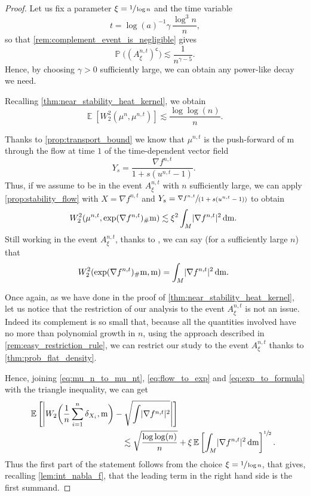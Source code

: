 \documentclass[JEP,XML,SOM,Unicode]{cedram}
\newcommand{\spfrac}[2]{\sfrac{#1}{(#2)}}
\theoremstyle{plain}
\theoremstyle{definition}
\numberwithin{equation}{section}
\renewcommand{\complement}{\ensuremath{\mathsf{c}}}\newcommand{\de}{\ensuremath{\,\mathrm d}}
\newcommand{\E}[1]{\ensuremath{\operatorname{\mathbb{E}}\left[#1\right]}}
\newcommand{\bP}[1]{\ensuremath{\operatorname{\mathbb{P}}\bigl(#1\bigr)}}
\newcommand{\fullstop}{\ensuremath{\text{. }}}
\newcommand{\m}{\ensuremath{\mathrm m}}
\DeclarePairedDelimiter\abs{\lvert}{\rvert}
\begin{document}
\begin{proof}
Let us fix a parameter $\xi=\sfrac1{\log n}$ and the time variable
\[
t=\log(a)^{-1}\gamma\,\frac{\log^3n}{n},
\]
so that \cref{rem:complement_event_is_negligible} gives
$$
\bP{(A^{n,t}_{\xi})^{\complement}} \lesssim \frac{1}{n^{\gamma-5}}\fullstop
$$
Hence, by choosing $\gamma>0$ sufficiently large, we can obtain any power-like decay we need.

Recalling \cref{thm:near_stability_heat_kernel}, we obtain
\begin{equation}\label{eq:mu_n_to_mu_nt}
\E{W^2_2(\mu^n,\mu^{n,t})} \lesssim \frac{\log\log(n)}n \fullstop
\end{equation}

Thanks to \cref{prop:transport_bound} we know that $\mu^{n,t}$ is the push-forward of $\m$ through the
flow at time $1$ of the time-dependent vector field
\begin{equation*}
Y_s = \frac{\nabla f^{n,t}}{1 + s(u^{n,t}-1)} \fullstop
\end{equation*}
Thus, if we assume to be in the event $A^{n,t}_\xi$ with $n$ sufficiently large,
we can apply \cref{prop:stability_flow} with $X=\nabla f^{n,t}$ and
$Y_s=\spfrac{\nabla f^{n,t}}{1 + s(u^{n,t}-1)}$ to obtain
\begin{equation}\label{eq:flow_to_exp}
W^2_2(\mu^{n,t}, \exp(\nabla f^{n,t})_\#\m)
\lesssim
\xi^2\int_M \abs{\nabla f^{n,t}}^2\de\m \fullstop
\end{equation}
Still working in the event $A^{n,t}_\xi$, thanks to \cite[Th.\,1.1]{Glaudo19}, we can say
(for a sufficiently large $n$) that
\begin{equation}\label{eq:exp_to_formula}
W^2_2(\exp(\nabla f^{n,t})_\#\m, \m) = \int_M \abs{\nabla f^{n,t}}^2 \de\m\fullstop
\end{equation}

Once again, as we have done in the proof of \cref{thm:near_stability_heat_kernel},
let us notice that the restriction of our analysis to the event $A^{n,t}_\xi$ is not an issue.
Indeed its complement is so small that,
because all the quantities involved have no more than polynomial growth in $n$, using
the approach described in \cref{rem:easy_restriction_rule}, we can restrict our study to the
event $A^{n,t}_\xi$ thanks to \cref{thm:prob_flat_density}.

Hence, joining \cref{eq:mu_n_to_mu_nt}, \cref{eq:flow_to_exp} and \cref{eq:exp_to_formula}
with the triangle inequality, we can get
\begin{align*}
\E{\abs*{W_2\biggl(\frac1n\sum_{i=1}^n\delta_{X_i}, \m\biggr)
- \sqrt{\int \abs{\nabla f^{n,t}}^2}}} &\\
\lesssim
\sqrt{\frac{\log\log(n)}n} &
+
\xi\E{\int_M \abs{\nabla f^{n,t}}^2\de\m}^{\sfrac12}\fullstop
\end{align*}
Thus the first part of the statement follows from the choice $\xi=\sfrac{1}{\log n}$,
that gives, recalling \cref{lem:int_nabla_f}, that the leading term in the right hand side
is the first summand.


\end{proof}
\end{document}

